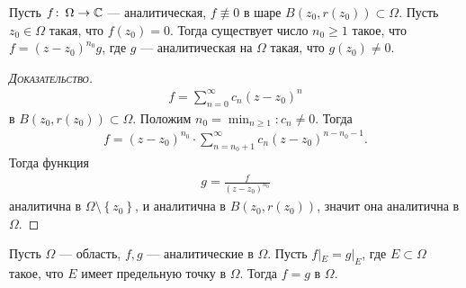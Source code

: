 \documentclass[../complex-analysis.tex]{subfiles}
\begin{document}
\begin{lm}
\label{lemma:zero_multiplicity}
 Пусть $ f\colon\,\Omega \to \mathbb{C} $ --- аналитическая, $ f \not\equiv 0 $ в шаре $ B(z_0,r(z_0)) \subset \Omega $. Пусть $ z_0 \in \Omega $ такая, что $ f(z_0) = 0 $. Тогда существует число $ n_0 \geqslant 1 $ такое, что $ f = (z - z_0)^{n_0}g $, где $ g $ --- аналитическая на $ \Omega $ такая, что $ g(z_0) \neq 0 $.
\end{lm}
\begin{proof}[\normalfont\textsc{Доказательство}]
 \begin{align*}
  f = \sum_{n=0}^{\infty}c_n(z-z_0)^{n}
 \end{align*} в $ B(z_0, r(z_0)) \subset \Omega $. Положим $ n_0 = \min_{n \geqslant 1} : c_n \neq 0 $. Тогда
 \begin{align*}
  f = (z - z_0)^{n_0} \cdot \sum_{n=n_0 + 1}^{\infty} c_n(z-z_0)^{n - n_0 - 1}.
 \end{align*} Тогда функция
 \begin{align*}
  g = \frac{f}{(z - z_0)^{n_0}}
 \end{align*}  аналитична в $ \Omega \setminus \left\{ z_0 \right\} $, и аналитична в $ B(z_0, r(z_0)) $, значит она аналитична в $ \Omega $.
\end{proof}
\begin{thm}
Пусть $ \Omega $ --- область, $ f,g $ --- аналитические в $ \Omega $. Пусть $ f |_E = g|_E $, где $ E \subset \Omega $ такое, что $ E $ имеет предельную точку в $ \Omega $. Тогда $ f = g $ в $ \Omega $.
\end{thm}
\end{document}
